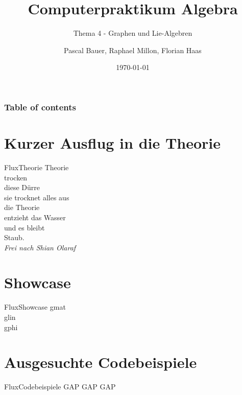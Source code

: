 \documentclass[9pt]{beamer}
\title{Computerpraktikum Algebra}
\subtitle{Thema 4 - Graphen und Lie-Algebren}
\author{Pascal Bauer, Raphael Millon, Florian Haas}
\institute{Sommersemester 2020}
\date{\today}
\begin{document}
\titlepage 

\begin{frame}
 \frametitle{Table of contents}
 \tableofcontents
\end{frame}

\section{Kurzer Ausflug in die Theorie}
\begin{frame}{Flux}{Theorie}
\centering
	Theorie\\
	trocken\\
	diese Dürre\\
	sie trocknet alles aus\\
	die Theorie\\
	entzieht das Wasser\\
	und es bleibt\\
	Staub.\\[0.5em]
\small\textit{Frei nach Shian Olaraf}
\end{frame}
\section{Showcase}
\begin{frame}{Flux}{Showcase}
gmat\\
glin\\
gphi\\
\end{frame}
\section{Ausgesuchte Codebeispiele}
\begin{frame}{Flux}{Codebeispiele}
GAP GAP GAP
\end{frame}
\end{document}
